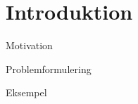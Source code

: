 \section{Introduktion}

\begin{frame}{Motivation}
\end{frame}

\begin{frame}{Problemformulering}
\end{frame}

\begin{frame}{Eksempel}
\end{frame}